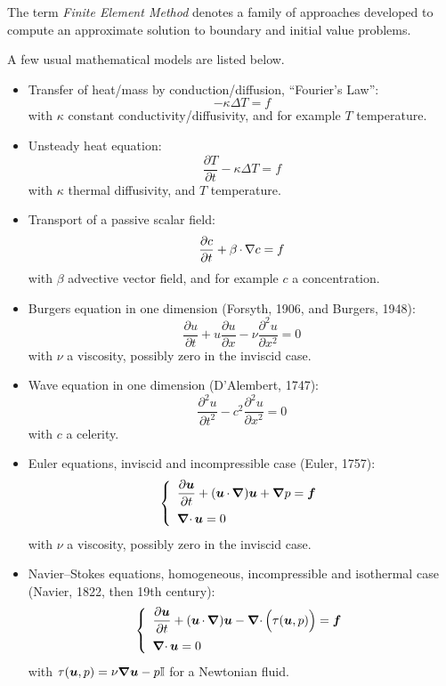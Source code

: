 \medskip
The term \textit{Finite Element Method} denotes a family of approaches developed to compute an approximate solution to boundary and initial value problems.

\begin{xmpl} A few usual mathematical models are listed below.

\begin{itemize}
\item
Transfer of heat/mass by conduction/diffusion, ``Fourier's Law'':
\[
- \kappa \Delta T = f
\]
with $\kappa$ constant conductivity/diffusivity, and for example $T$ temperature.
\item
Unsteady heat equation:
\[
\frac{\partial T}{\partial t} - \kappa \Delta T = f
\]
with $\kappa$ thermal diffusivity, and $T$ temperature.
\item
Transport of a passive scalar field:
\[
\frac{\partial c}{\partial t} + \beta\,{\mathbf\cdot}\,\nabla c = f
\]
with $\beta$ advective vector field, and for example $c$ a concentration.
\item
Burgers equation in one dimension (Forsyth, 1906, and Burgers, 1948):
\[
\frac{\partial u}{\partial t} + u\frac{\partial u}{\partial x} - \nu\frac{\partial^2 u}{\partial x^2} = 0
\]
with $\nu$ a viscosity, possibly zero in the inviscid case.
\item
Wave equation in one dimension (D'Alembert, 1747):
\[
\frac{\partial^2 u}{\partial t^2} - c^2 \frac{\partial^2 u}{\partial x^2} = 0
\]
with $c$ a celerity.
\item
Euler equations, inviscid and incompressible case (Euler, 1757):
\[
\left\lbrace
\begin{array}{l}
\displaystyle\frac{\partial {{\boldsymbol u}}}{\partial t} + ({{\boldsymbol u}}\,{\mathbf\cdot}\,{\boldsymbol\nabla}){{\boldsymbol u}} + {\boldsymbol\nabla} p = {\boldsymbol f}\\[2ex]
{\boldsymbol\nabla\cdot\,} {{\boldsymbol u}} = 0
\end{array}
\right.
\]
with $\nu$ a viscosity, possibly zero in the inviscid case.
\item
Navier--Stokes equations, homogeneous, incompressible and isothermal case (Navier, 1822, then 19th century):
\[
\left\lbrace
\begin{array}{l}
\displaystyle\frac{\partial {{\boldsymbol u}}}{\partial t} + ({{\boldsymbol u}}\,{\mathbf\cdot}\,{\boldsymbol\nabla}){{\boldsymbol u}} - {\boldsymbol\nabla\cdot\,}\Bigl(\tau({{\boldsymbol u}}, p)\Bigr) = {\boldsymbol f}\\[2ex]
{\boldsymbol\nabla\cdot\,} {{\boldsymbol u}} = 0
\end{array}
\right.
\]
with $\tau({{\boldsymbol u}}, p) = \nu {\boldsymbol\nabla}{{\boldsymbol u}} - p{\mathbf{\mathbb{I}}}$ for a Newtonian fluid.
\end{itemize}
\end{xmpl}

